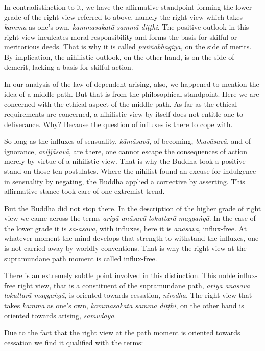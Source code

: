 In contradistinction to it, we have the affirmative standpoint forming the lower grade of the right view referred to above, namely the right view which takes \emph{kamma} as one's own, \emph{kammasakatā sammā diṭṭhi}. The positive outlook in this right view inculcates moral responsibility and forms the basis for skilful or meritorious deeds. That is why it is called \emph{puññabhāgiya,} on the side of merits. By implication, the nihilistic outlook, on the other hand, is on the side of demerit, lacking a basis for skilful action.

In our analysis of the law of dependent arising, also, we happened to mention the idea of a middle path. But that is from the philosophical standpoint. Here we are concerned with the ethical aspect of the middle path. As far as the ethical requirements are concerned, a nihilistic view by itself does not entitle one to deliverance. Why? Because the question of influxes is there to cope with.

So long as the influxes of sensuality, \emph{kāmāsavā}, of becoming, \emph{bhavāsavā}, and of ignorance, \emph{avijjāsavā}, are there, one cannot escape the consequences of action merely by virtue of a nihilistic view. That is why the Buddha took a positive stand on those ten postulates. Where the nihilist found an excuse for indulgence in sensuality by negating, the Buddha applied a corrective by asserting. This affirmative stance took care of one extremist trend.

But the Buddha did not stop there. In the description of the higher grade of right view we came across the terms \emph{ariyā anāsavā lokuttarā maggaṅgā}. In the case of the lower grade it is \emph{sa-āsavā}, with influxes, here it is \emph{anāsavā}, influx-free. At whatever moment the mind develops that strength to withstand the influxes, one is not carried away by worldly conventions. That is why the right view at the supramundane path moment is called influx-free.

There is an extremely subtle point involved in this distinction. This noble influx-free right view, that is a constituent of the supramundane path, \emph{ariyā anāsavā lokuttarā maggaṅgā}, is oriented towards cessation, \emph{nirodha}. The right view that takes \emph{kamma} as one's own, \emph{kammasakatā sammā diṭṭhi}, on the other hand is oriented towards arising, \emph{samudaya}.

Due to the fact that the right view at the path moment is oriented towards cessation we find it qualified with the terms:

